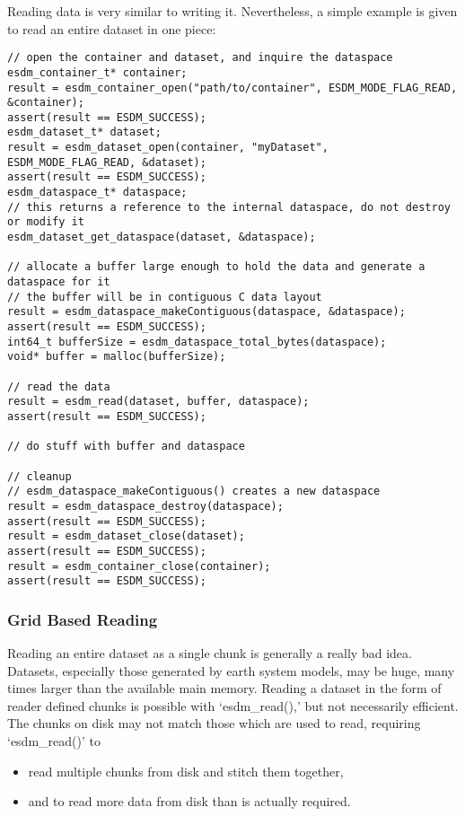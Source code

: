 Reading data is very similar to writing it. Nevertheless, a simple
example is given to read an entire dataset in one piece:

\begin{lstlisting}
// open the container and dataset, and inquire the dataspace
esdm_container_t* container;
result = esdm_container_open("path/to/container", ESDM_MODE_FLAG_READ, &container);
assert(result == ESDM_SUCCESS);
esdm_dataset_t* dataset;
result = esdm_dataset_open(container, "myDataset", ESDM_MODE_FLAG_READ, &dataset);
assert(result == ESDM_SUCCESS);
esdm_dataspace_t* dataspace;
// this returns a reference to the internal dataspace, do not destroy or modify it
esdm_dataset_get_dataspace(dataset, &dataspace);  

// allocate a buffer large enough to hold the data and generate a dataspace for it
// the buffer will be in contiguous C data layout
result = esdm_dataspace_makeContiguous(dataspace, &dataspace);  
assert(result == ESDM_SUCCESS);
int64_t bufferSize = esdm_dataspace_total_bytes(dataspace);
void* buffer = malloc(bufferSize);

// read the data
result = esdm_read(dataset, buffer, dataspace);
assert(result == ESDM_SUCCESS);

// do stuff with buffer and dataspace

// cleanup
// esdm_dataspace_makeContiguous() creates a new dataspace
result = esdm_dataspace_destroy(dataspace); 
assert(result == ESDM_SUCCESS);
result = esdm_dataset_close(dataset);
assert(result == ESDM_SUCCESS);
result = esdm_container_close(container);
assert(result == ESDM_SUCCESS);
\end{lstlisting}

\subsubsection{Grid Based Reading}%

Reading an entire dataset as a single chunk is generally a really bad
idea. Datasets, especially those generated by earth system models, may
be huge, many times larger than the available main memory. Reading a
dataset in the form of reader defined chunks is possible with
`esdm\_read(),' but not necessarily efficient. The chunks on disk may
not match those which are used to read, requiring `esdm\_read()' to

\begin{itemize}
  \item read multiple chunks from disk and stitch them together,
  \item and to read more data from disk than is actually required.
\end{itemize}

